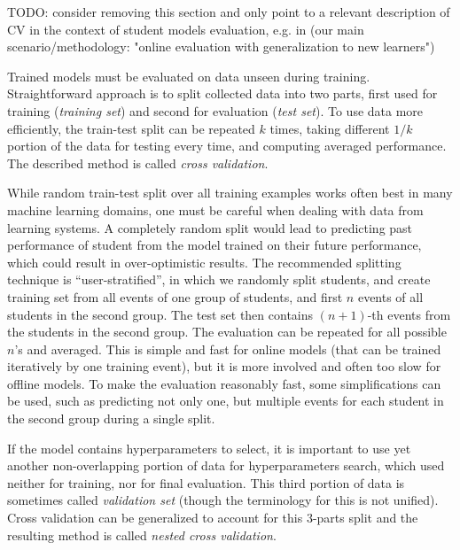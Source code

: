 TODO: consider removing this section and only point to a relevant description
of CV in the context of student models evaluation, e.g. in \cite{pelanek-learner-modeling}
(our main scenario/methodology: "online evaluation with generalization to new learners")

Trained models must be evaluated on data unseen during training.
Straightforward approach is to split collected data into two parts,
  first used for training (\emph{training set})
  and second for evaluation (\emph{test set}).
To use data more efficiently, the train-test split can be repeated
  $k$ times, taking different $1/k$ portion of the data for testing every time,
  and computing averaged performance.
The described method is called \emph{cross validation}.

While random train-test split over all training examples works often
  best in many machine learning domains,
  one must be careful when dealing with data from learning systems.
A completely random split would lead to predicting past performance
  of student from the model trained on their future performance,
  which could result in over-optimistic results.
The recommended splitting technique is ``user-stratified'',
  in which we randomly split students,
  and create training set from all events of one group of students,
  and first $n$ events of all students in the second group.
The test set then contains $(n+1)$-th events from the students
  in the second group.
The evaluation can be repeated for all possible $n$'s and averaged.
This is simple and fast for online models
  (that can be trained iteratively by one training event),
  but it is more involved and often too slow for offline models.
To make the evaluation reasonably fast,
  some simplifications can be used,
  such as predicting not only one, but multiple events
  for each student in the second group during a single split.


If the model contains hyperparameters to select,
  it is important to use yet another non-overlapping portion
  of data for hyperparameters search,
  which used neither for training, nor for final evaluation.
This third portion of data is sometimes called \emph{validation set}
  (though the terminology for this is not unified).
Cross validation can be generalized to account for this 3-parts split
  and the resulting method is called \emph{nested cross validation}.

